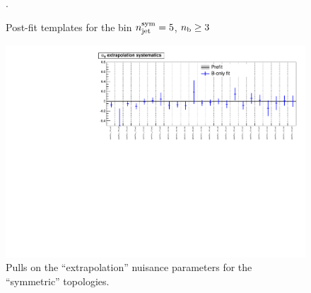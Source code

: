 \newpage
\begin{figure}[h!]
\caption{Post-fit \MHT templates for the bin $n_{\mathrm{jet}}^{\mathrm{sym}}=5$, $n_{\text{b}}\ge 3$ \label{fig:postFitShapes_ge3b_ge5j}}.
\begin{center}
    \hspace{1cm}
\end{center}
\end{figure}




\newpage
\begin{landscape}
\begin{figure}[h!]
\caption{Pulls on the ``\alt extrapolation'' nuisance parameters for the ``symmetric'' topologies.\label{fig:nuisPull_alphaT_sym}}
    \includegraphics[width=\linewidth]{figures/postFitResults/alphaT_sym_ALL_nuisances.pdf}
\end{figure}
\end{landscape}



